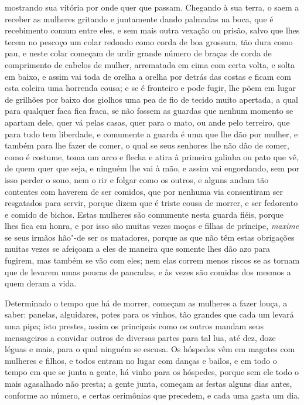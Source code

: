 mostrando sua vitória por onde quer que passam. Chegando à sua terra,
o saem a receber as mulheres gritando e juntamente dando palmadas na
boca, que é recebimento comum entre eles, e sem mais outra vexação ou
prisão, salvo que lhes tecem no pescoço um colar redondo como corda de
boa grossura, tão dura como pau, e neste colar começam de urdir grande
número de braças de corda de comprimento de cabelos de mulher,
arrematada em cima com certa volta, e solta em baixo, e assim vai toda
de orelha a orelha por detrás das costas e ficam com esta coleira uma
horrenda cousa; e se é fronteiro e pode fugir, lhe põem em lugar de
grilhões por baixo dos giolhos uma pea de fio de tecido muito apertada,
a qual para qualquer faca fica fraca, se não fossem as guardas que
nenhum momento se apartam dele, quer vá pelas casas, quer para o mato,
ou ande pelo terreiro, que para tudo tem liberdade, e comumente a
guarda é uma que lhe dão por mulher, e também para lhe fazer de comer,
o qual se seus senhores lhe não dão de comer, como é costume, toma um
arco e flecha e atira à primeira galinha ou pato que vê, de quem quer
que seja, e ninguém lhe vai à mão, e assim vai engordando, sem por isso
perder o sono, nem o rir e folgar como os outros, e alguns andam tão
contentes com haverem de ser comidos, que por nenhuma via consentiram
ser resgatados para servir, porque dizem que é triste cousa de morrer,
e ser fedorento e comido de bichos. Estas mulheres são comumente nesta
guarda fiéis, porque lhes fica em honra, e por isso são muitas vezes
moças e filhas de príncipe, \textit{maxime} se seus irmãos hão"-de ser os
matadores, porque as que não têm estas obrigações muitas vezes se
afeiçoam a eles de maneira que somente lhes dão azo para fugirem, mas
também se vão com eles; nem elas correm menos riscos se as tornam que
de levarem umas poucas de pancadas, e às vezes são comidas dos mesmos a
quem deram a vida.

 Determinado o tempo que há de morrer, começam as mulheres a fazer
louça, a saber: panelas, alguidares, potes para os vinhos, tão grandes
que cada um levará uma pipa; isto prestes, assim os principais como os
outros mandam seus mensageiros a convidar outros de diversas partes
para tal lua, até dez, doze léguas e mais, para o qual ninguém se
escusa. Os hóspedes vêm em magotes com mulheres e filhos, e todos
entram no lugar com danças e bailos, e em todo o tempo em que se junta
a gente, há vinho para os hóspedes, porque sem ele todo o mais
agasalhado não presta; a gente junta, começam as festas alguns dias
antes, conforme ao número, e certas cerimônias que precedem, e cada uma
gasta um dia.

